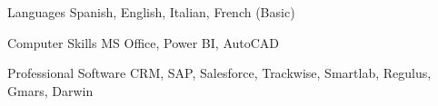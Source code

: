 

\begin{cvskills}

\cvskill
    {Languages} %
    {Spanish, English, Italian, French (Basic)} %

\cvskill
    {Computer Skills} %
    {MS Office, Power BI, AutoCAD} %

\cvskill
    {Professional Software} %
    {CRM, SAP, Salesforce, Trackwise, Smartlab, Regulus, Gmars, Darwin} %

\end{cvskills}

